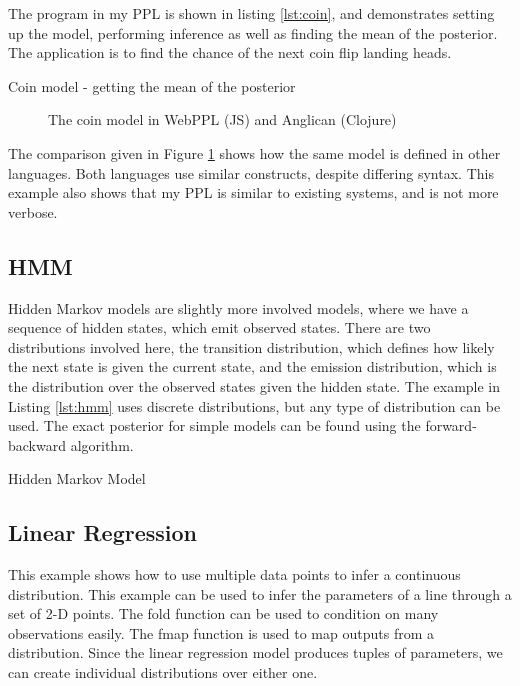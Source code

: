 The program in my PPL is shown in listing \ref{lst:coin}, and demonstrates setting up the model, performing inference as well as finding the mean of the posterior. The application is to find the chance of the next coin flip landing heads.

\begin{listing}[!ht]
	\caption{Coin model - getting the mean of the posterior}
	\label{lst:coin}
\end{listing}


\begin{figure}[!htb]
	\begin{minipage}{0.5\textwidth}
		\centering
	\end{minipage}
	\begin{minipage}{0.5\textwidth}
		\centering
	\end{minipage}
	\caption{The coin model in WebPPL (JS) and Anglican (Clojure)}
	\label{fig:compare-coin}
\end{figure}

The comparison given in Figure \ref{fig:compare-coin} shows how the same model is defined in other languages. Both languages use similar constructs, despite differing syntax. This example also shows that my PPL is similar to existing systems, and is not more verbose.

\subsection{HMM}
Hidden Markov models are slightly more involved models, where we have a sequence of hidden states, which emit observed states. There are two distributions involved here, the transition distribution, which defines how likely the next state is given the current state, and the emission distribution, which is the distribution over the observed states given the hidden state. The example in Listing \ref{lst:hmm} uses discrete distributions, but any type of distribution can be used. The exact posterior for simple models can be found using the forward-backward algorithm.
\begin{listing}[!ht]
	\caption{Hidden Markov Model}
	\label{lst:hmm}
\end{listing}

\subsection{Linear Regression}
This example shows how to use multiple data points to infer a continuous distribution. This example can be used to infer the parameters of a line through a set of 2-D points. The fold function can be used to condition on many observations easily. The fmap function is used to map outputs from a distribution. Since the linear regression model produces tuples of parameters, we can create individual distributions over either one.

